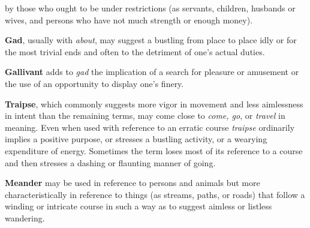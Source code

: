 \begin{description}[style=unboxed]
\begin{mynewitemize}
by those who ought to be under restrictions (as servants, children, husbands or
wives, and persons who have not much strength or enough money).
\item \textbf{Gad}, usually with \textit{about}, may suggest a bustling from
place to place idly or for the most trivial ends and often to the detriment of
one's actual duties.
\item \textbf{Gallivant} adds to \textit{gad} the implication of a search for
pleasure or amusement or the use of an opportunity to display one's finery.
\item \textbf{Traipse}, which commonly suggests more vigor in movement and less
aimlessness in intent than the remaining terms, may come close to \textit{come,
go}, or \textit{travel} in meaning. Even when used with reference to an erratic
course \textit{traipse} ordinarily implies a positive purpose, or stresses a
bustling activity, or a wearying expenditure of energy. Sometimes the term loses
most of its reference to a course and then stresses a dashing or flaunting
manner of going.
\item \textbf{Meander} may be used in reference to persons and animals but more
characteristically in reference to things (as streams, paths, or roads) that
follow a winding or intricate course in such a way as to suggest aimless or
listless wandering.
\end{mynewitemize}









\end{description}
